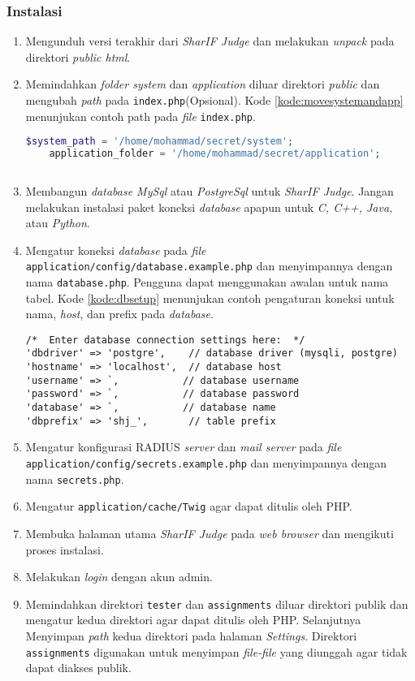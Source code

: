 \subsubsection{Instalasi}
\begin{enumerate}
\item Mengunduh versi terakhir dari \textit{SharIF Judge} dan melakukan \textit{unpack} pada direktori \textit{public html}.
\item Memindahkan \textit{folder system} dan \textit{application} diluar direktori \textit{public} dan mengubah \textit{path} pada \verb|index.php|(Opsional). Kode \ref{kode:movesystemandapp} menunjukan contoh path pada \textit{file} \texttt{index.php}.

\begin{lstlisting}[language=PHP, caption=Contoh \textit{path} pada halaman index.php, label=kode:movesystemandapp]
	$system_path = '/home/mohammad/secret/system';
	application_folder = '/home/mohammad/secret/application';
	
\end{lstlisting}
\item Membangun \textit{database MySql} atau \textit{PostgreSql} untuk \textit{SharIF Judge}. Jangan melakukan instalasi paket koneksi \textit{database} apapun untuk \textit{C, C++, Java,} atau \textit{Python}.
\item Mengatur koneksi \textit{database} pada \textit{file} \verb|application/config/database.example.php| dan menyimpannya dengan nama \verb|database.php|. Pengguna dapat menggunakan awalan untuk nama tabel. Kode \ref{kode:dbsetup} menunjukan contoh pengaturan koneksi untuk nama, \textit{host}, dan prefix pada \textit{database}.

\begin{lstlisting}[caption=Contoh pengaturan koneksi untuk \textit{database}, label=kode:dbsetup]
/*  Enter database connection settings here:  */
'dbdriver' => 'postgre',    // database driver (mysqli, postgre)
'hostname' => 'localhost',  // database host
'username' => `,           // database username
'password' => `,           // database password
'database' => `,           // database name
'dbprefix' => 'shj_',       // table prefix
\end{lstlisting}
\item Mengatur konfigurasi RADIUS \textit{server} dan \textit{mail server} pada \textit{file} \texttt{application/config/secrets.example.php} dan menyimpannya dengan nama \verb|secrets.php|.
\item Mengatur \verb|application/cache/Twig| agar dapat ditulis oleh PHP.
\item Membuka halaman utama \textit{SharIF Judge} pada \textit{web browser} dan mengikuti proses instalasi.
\item Melakukan \textit{login} dengan akun admin.
\item Memindahkan direktori \verb|tester| dan \verb|assignments| diluar direktori publik dan mengatur kedua direktori agar dapat ditulis oleh PHP. Selanjutnya Menyimpan \textit{path} kedua direktori pada halaman \textit{Settings}. Direktori \verb|assignments| digunakan untuk menyimpan \textit{file-file} yang diunggah agar tidak dapat diakses publik.


\end{enumerate}
